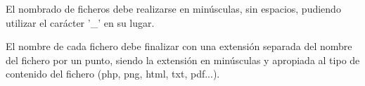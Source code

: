 El nombrado de ficheros debe realizarse en minúsculas, sin espacios, pudiendo utilizar el carácter '\_' en su lugar.

El nombre de cada fichero debe finalizar con una extensión separada del nombre del fichero por un punto, siendo la extensión en minúsculas y apropiada al tipo de contenido del fichero (php, png, html, txt, pdf...).